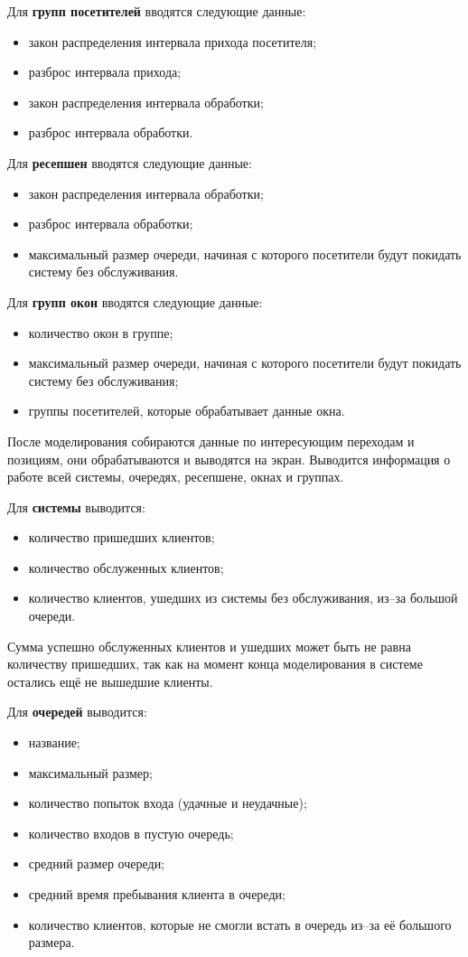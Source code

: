 Для \textbf{групп посетителей} вводятся следующие данные: 
\begin{itemize}[label=---]
	\item закон распределения интервала прихода посетителя;
	\item разброс интервала прихода;
	\item закон распределения интервала обработки;
	\item разброс интервала обработки.
\end{itemize}

Для \textbf{ресепшен} вводятся следующие данные: 
\begin{itemize}[label=---]
	\item закон распределения интервала обработки;
	\item разброс интервала обработки;
	\item максимальный размер очереди, начиная с которого посетители будут покидать систему без обслуживания.
\end{itemize}

Для \textbf{групп окон} вводятся следующие данные: 
\begin{itemize}[label=---]
	\item количество окон в группе;
	\item максимальный размер очереди, начиная с которого посетители будут покидать систему без обслуживания;
	\item группы посетителей, которые обрабатывает данные окна.
\end{itemize}

После моделирования собираются данные по интересующим переходам и позициям, они обрабатываются и выводятся на экран. Выводится информация о работе всей системы, очередях, ресепшене, окнах и группах.

Для \textbf{системы} выводится:
\begin{itemize}[label=---]
	\item количество пришедших клиентов;
	\item количество обслуженных клиентов;
	\item количество клиентов, ушедших из системы без обслуживания, из--за большой очереди.
\end{itemize}
Сумма успешно обслуженных клиентов и ушедших может быть не равна количеству пришедших, так как на момент конца моделирования в системе остались ещё не вышедшие клиенты.

Для \textbf{очередей} выводится:
\begin{itemize}[label=---]
	\item название;
	\item максимальный размер;
	\item количество попыток входа (удачные и неудачные);
	\item количество входов в пустую очередь;
	\item средний размер очереди;
	\item средний время пребывания клиента в очереди;
	\item количество клиентов, которые не смогли встать в очередь из--за её большого размера.
\end{itemize}

